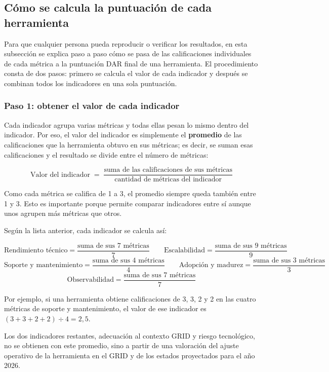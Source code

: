 \subsection{Cómo se calcula la puntuación de cada herramienta}\label{subsec:formalizacion}

Para que cualquier persona pueda reproducir o verificar los resultados,
en esta subsección se explica paso a paso cómo se pasa de las
calificaciones individuales de cada métrica a la puntuación DAR final de
una herramienta. El procedimiento consta de dos pasos: primero se calcula
el valor de cada indicador y después se combinan todos los indicadores en
una sola puntuación.

\subsubsection{Paso 1: obtener el valor de cada indicador}

Cada indicador agrupa varias métricas y todas ellas pesan lo mismo dentro
del indicador. Por eso, el valor del indicador es simplemente el
\textbf{promedio} de las calificaciones que la herramienta obtuvo en sus
métricas; es decir, se suman esas calificaciones y el resultado se divide
entre el número de métricas:

\[
  \text{Valor del indicador} \;=\;
  \frac{\text{suma de las calificaciones de sus métricas}}
       {\text{cantidad de métricas del indicador}}
\]

Como cada métrica se califica de 1 a 3, el promedio siempre queda también
entre 1 y 3. Esto es importante porque permite comparar indicadores entre
sí aunque unos agrupen más métricas que otros.

Según la lista anterior, cada indicador se calcula así:

\[
  \text{Rendimiento técnico} =
  \frac{\text{suma de sus 7 métricas}}{7}
  \qquad
  \text{Escalabilidad} =
  \frac{\text{suma de sus 9 métricas}}{9}
\]
\[
  \text{Soporte y mantenimiento} =
  \frac{\text{suma de sus 4 métricas}}{4}
  \qquad
  \text{Adopción y madurez} =
  \frac{\text{suma de sus 3 métricas}}{3}
\]
\[
  \text{Observabilidad} =
  \frac{\text{suma de sus 7 métricas}}{7}
\]

Por ejemplo, si una herramienta obtiene calificaciones de 3, 3, 2 y 2 en
las cuatro métricas de soporte y mantenimiento, el valor de ese indicador
es $(3+3+2+2) \div 4 = 2{,}5$.

Los dos indicadores restantes, adecuación al contexto GRID y riesgo
tecnológico, no se obtienen con este promedio, sino a partir de una
valoración del ajuste operativo de la herramienta en el GRID y de los
estados proyectados para el año 2026.

